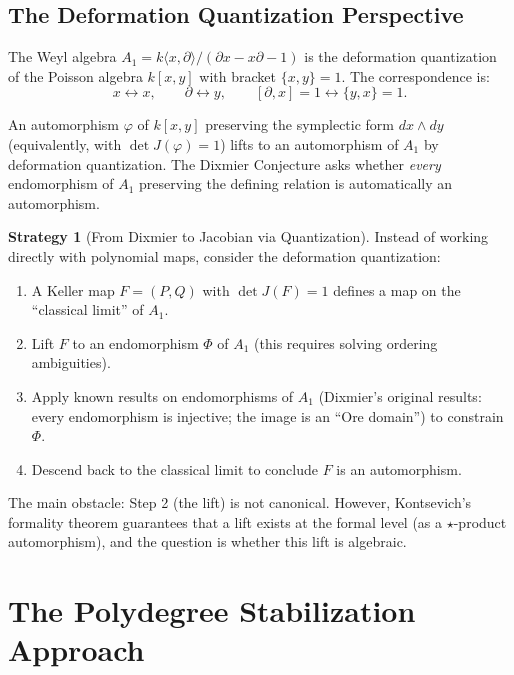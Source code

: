 \documentclass[12pt,a4paper]{article}
\theoremstyle{definition}
\newtheorem{strategy}[theorem]{Strategy}
\newcommand{\kk}{k}
\begin{document}
\subsection{The Deformation Quantization Perspective}

The Weyl algebra $A_1 = \kk\langle x, \partial \rangle / (\partial x - x\partial - 1)$ is the
deformation quantization of the Poisson algebra $\kk[x, y]$ with bracket $\{x, y\} = 1$.
The correspondence is:
\[
  x \longleftrightarrow x, \qquad \partial \longleftrightarrow y, \qquad
  [\partial, x] = 1 \longleftrightarrow \{y, x\} = 1.
\]

An automorphism $\varphi$ of $\kk[x,y]$ preserving the symplectic form $dx \wedge dy$
(equivalently, with $\det J(\varphi) = 1$) lifts to an automorphism of $A_1$ by deformation
quantization. The Dixmier Conjecture asks whether \emph{every} endomorphism of $A_1$
preserving the defining relation is automatically an automorphism.

\begin{strategy}[From Dixmier to Jacobian via Quantization]
Instead of working directly with polynomial maps, consider the deformation quantization:
\begin{enumerate}
\item A Keller map $F = (P, Q)$ with $\det J(F) = 1$ defines a map on the ``classical
  limit'' of $A_1$.
\item Lift $F$ to an endomorphism $\Phi$ of $A_1$ (this requires solving ordering ambiguities).
\item Apply known results on endomorphisms of $A_1$ (Dixmier's original results: every
  endomorphism is injective; the image is an ``Ore domain'') to constrain $\Phi$.
\item Descend back to the classical limit to conclude $F$ is an automorphism.
\end{enumerate}

The main obstacle: Step 2 (the lift) is not canonical. However, Kontsevich's formality
theorem guarantees that a lift exists at the formal level (as a $\star$-product
automorphism), and the question is whether this lift is algebraic.
\end{strategy}

\section{The Polydegree Stabilization Approach}
\end{document}
